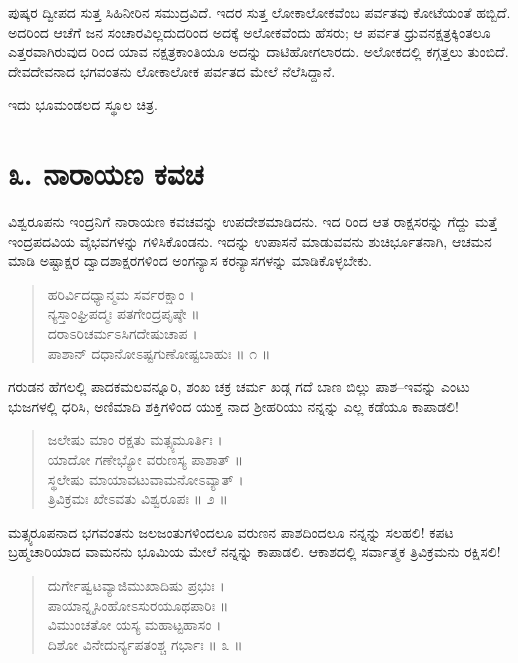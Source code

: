 ಪುಷ್ಕರ ದ್ವೀಪದ ಸುತ್ತ ಸಿಹಿನೀರಿನ ಸಮುದ್ರವಿದೆ. ಇದರ ಸುತ್ತ ಲೋಕಾಲೋಕವೆಂಬ ಪರ್ವತವು ಕೋಟೆಯಂತೆ ಹಬ್ಬಿದೆ. ಅದರಿಂದ ಆಚೆಗೆ ಜನ ಸಂಚಾರವಿಲ್ಲದುದರಿಂದ ಅದಕ್ಕೆ ಅಲೋಕವೆಂದು ಹೆಸರು; ಆ ಪರ್ವತ ಧ್ರುವನಕ್ಷತ್ರಕ್ಕಿಂತಲೂ ಎತ್ತರವಾಗಿರುವುದ ರಿಂದ ಯಾವ ನಕ್ಷತ್ರಕಾಂತಿಯೂ ಅದನ್ನು ದಾಟಿಹೋಗಲಾರದು. ಅಲೋಕದಲ್ಲಿ ಕಗ್ಗತ್ತಲು ತುಂಬಿದೆ. ದೇವದೇವನಾದ ಭಗವಂತನು ಲೋಕಾಲೋಕ ಪರ್ವತದ ಮೇಲೆ ನೆಲೆಸಿದ್ದಾನೆ.

\begin{center}
ಇದು ಭೂಮಂಡಲದ ಸ್ಥೂಲ ಚಿತ್ರ.
\end{center}


\section{೩. ನಾರಾಯಣ ಕವಚ}

ವಿಶ್ವರೂಪನು ಇಂದ್ರನಿಗೆ ನಾರಾಯಣ ಕವಚವನ್ನು ಉಪದೇಶಮಾಡಿದನು. ಇದ ರಿಂದ ಆತ ರಾಕ್ಷಸರನ್ನು ಗೆದ್ದು ಮತ್ತೆ ಇಂದ್ರಪದವಿಯ ವೈಭವಗಳನ್ನು ಗಳಿಸಿಕೊಂಡನು. ಇದನ್ನು ಉಪಾಸನೆ ಮಾಡುವವನು ಶುಚಿರ್ಭೂತನಾಗಿ, ಆಚಮನ ಮಾಡಿ ಅಷ್ಟಾಕ್ಷರ ದ್ವಾದಶಾಕ್ಷರಗಳಿಂದ ಅಂಗನ್ಯಾಸ ಕರನ್ಯಾಸಗಳನ್ನು ಮಾಡಿಕೊಳ್ಳಬೇಕು.

\begin{verse}
ಹರಿರ್ವಿದಧ್ಯಾನ್ಮಮ ಸರ್ವರಕ್ಷಾಂ ।\\ನ್ಯಸ್ತಾಂಘ್ರಿಪದ್ಮಃ ಪತಗೇಂದ್ರಪೃಷ್ಠೇ ॥\\ದರಾಽರಿಚರ್ಮಽಸಿಗದೇಷುಚಾಪ ।\\ಪಾಶಾನ್ ದಧಾನೋಽಷ್ಟಗುಣೋಷ್ಟಬಾಹುಃ \num{ ॥ ೧ ॥}
\end{verse}

ಗರುಡನ ಹೆಗಲಲ್ಲಿ ಪಾದಕಮಲವನ್ನೂರಿ, ಶಂಖ ಚಕ್ರ ಚರ್ಮ ಖಡ್ಗ ಗದೆ ಬಾಣ ಬಿಲ್ಲು ಪಾಶ–ಇವನ್ನು ಎಂಟು ಭುಜಗಳಲ್ಲಿ ಧರಿಸಿ, ಅಣಿಮಾದಿ ಶಕ್ತಿಗಳಿಂದ ಯುಕ್ತ ನಾದ ಶ್ರೀಹರಿಯು ನನ್ನನ್ನು ಎಲ್ಲ ಕಡೆಯೂ ಕಾಪಾಡಲಿ!

\begin{verse}
ಜಲೇಷು ಮಾಂ ರಕ್ಷತು ಮತ್ಸ್ಯಮೂರ್ತಿಃ ।\\ಯಾದೋ ಗಣೇಭ್ಯೋ ವರುಣಸ್ಯ ಪಾಶಾತ್ ॥\\ಸ್ಥಲೇಷು ಮಾಯಾವಟುವಾಮನೋಽವ್ಯಾತ್ ।\\ತ್ರಿವಿಕ್ರಮಃ ಖೇಽವತು ವಿಶ್ವರೂಪಃ \num{ ॥ ೨ ॥}
\end{verse}

ಮತ್ಸ್ಯರೂಪನಾದ ಭಗವಂತನು ಜಲಜಂತುಗಳಿಂದಲೂ ವರುಣನ ಪಾಶದಿಂದಲೂ ನನ್ನನ್ನು ಸಲಹಲಿ! ಕಪಟ ಬ್ರಹ್ಮಚಾರಿಯಾದ ವಾಮನನು ಭೂಮಿಯ ಮೇಲೆ ನನ್ನನ್ನು ಕಾಪಾಡಲಿ. ಆಕಾಶದಲ್ಲಿ ಸರ್ವಾತ್ಮಕ ತ್ರಿವಿಕ್ರಮನು ರಕ್ಷಿಸಲಿ!

\begin{verse}
ದುರ್ಗೇಷ್ವಟವ್ಯಾಜಿಮುಖಾದಿಷು ಪ್ರಭುಃ ।\\ಪಾಯಾನ್ನೃಸಿಂಹೋಽಸುರಯೂಥಪಾರಿಃ ॥\\ವಿಮುಂಚತೋ ಯಸ್ಯ ಮಹಾಟ್ಟಹಾಸಂ ।\\ದಿಶೋ ವಿನೇದುರ್ನ್ಯಪತಂಶ್ಚ ಗರ್ಭಾಃ \num{॥ ೩ ॥}
\end{verse}

